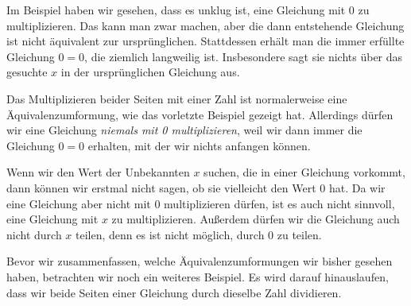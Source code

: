 \documentclass[../../main.tex]{subfiles}
\begin{document}
Im Beispiel haben wir gesehen, dass es unklug ist, eine Gleichung mit 0 zu multiplizieren. Das kann man zwar machen, aber die dann entstehende Gleichung ist nicht äquivalent zur ursprünglichen. Stattdessen erhält man die immer erfüllte Gleichung $0=0$, die ziemlich langweilig ist. Insbesondere sagt sie nichts über das gesuchte $x$ in der ursprünglichen Gleichung aus.

Das Multiplizieren beider Seiten mit einer Zahl ist normalerweise eine Äquivalenzumformung, wie das vorletzte Beispiel gezeigt hat. Allerdings dürfen wir eine Gleichung \emph{niemals mit 0 multiplizieren}, weil wir dann immer die Gleichung $0=0$ erhalten, mit der wir nichts anfangen können.

Wenn wir den Wert der Unbekannten $x$ suchen, die in einer Gleichung vorkommt, dann können wir erstmal nicht sagen, ob sie vielleicht den Wert $0$ hat. Da wir eine Gleichung aber nicht mit $0$ multiplizieren dürfen, ist es auch nicht sinnvoll, eine Gleichung mit $x$ zu multiplizieren. Außerdem dürfen wir die Gleichung auch nicht durch $x$ teilen, denn es ist nicht möglich, durch $0$ zu teilen.

Bevor wir zusammenfassen, welche Äquivalenzumformungen wir bisher gesehen haben, betrachten wir noch ein weiteres Beispiel. Es wird darauf hinauslaufen, dass wir beide Seiten einer Gleichung durch dieselbe Zahl dividieren.
\end{document}
